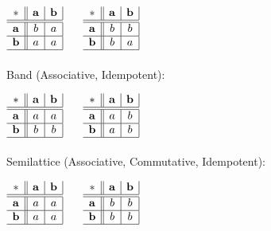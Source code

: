 $\begin{array}{c||c|c|}
  * & \mathbf{a} & \mathbf{b} \\ \hline \hline
  \mathbf{a} & b & a \\ \hline
  \mathbf{b} & a & a \\ \hline
\end{array}$ $\quad$ $\begin{array}{c||c|c|}
  * & \mathbf{a} & \mathbf{b} \\ \hline \hline
  \mathbf{a} & b & b \\ \hline
  \mathbf{b} & b & a \\ \hline
\end{array}$
\\ \\
Band (Associative, Idempotent):

$\begin{array}{c||c|c|}
  * & \mathbf{a} & \mathbf{b} \\ \hline \hline
  \mathbf{a} & a & a \\ \hline
  \mathbf{b} & b & b \\ \hline
\end{array}$ $\quad$ $\begin{array}{c||c|c|}
  * & \mathbf{a} & \mathbf{b} \\ \hline \hline
  \mathbf{a} & a & b \\ \hline
  \mathbf{b} & a & b \\ \hline
\end{array}$
\\ \\
Semilattice (Associative, Commutative, Idempotent):

$\begin{array}{c||c|c|}
  * & \mathbf{a} & \mathbf{b} \\ \hline \hline
  \mathbf{a} & a & a \\ \hline
  \mathbf{b} & a & a \\ \hline
\end{array}$ $\quad$ $\begin{array}{c||c|c|}
  * & \mathbf{a} & \mathbf{b} \\ \hline \hline
  \mathbf{a} & b & b \\ \hline
  \mathbf{b} & b & b \\ \hline
\end{array}$ \\ \hfill \\

